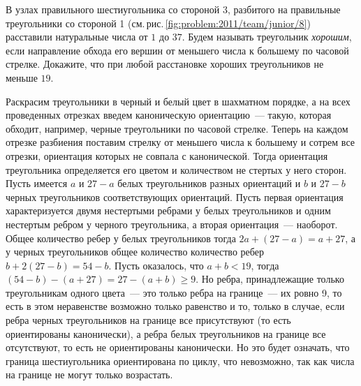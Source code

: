 %
\label{problem:2011/team/junior/8}%
В узлах правильного шестиугольника со стороной 3, разбитого на правильные
треугольники со стороной 1
(см.\,рис.\,\ref{fig:problem:2011/team/junior/8})
расставили натуральные числа от $1$ до $37$.
Будем называть треугольник \emph{хорошим}, если направление обхода его вершин от
меньшего числа к большему по часовой стрелке.
Докажите, что при любой расстановке хороших треугольников не меньше $19$.

\solution
Раскрасим треугольники в черный и белый цвет в шахматном порядке, а на всех
проведенных отрезках введем каноническую ориентацию~--- такую, которая обходит,
например, черные треугольники по часовой стрелке.
Теперь на каждом отрезке разбиения поставим стрелку от меньшего числа к
большему и сотрем все отрезки, ориентация которых не совпала с канонической.
Тогда ориентация треугольника определяется его цветом и количеством не стертых
у него сторон.
Пусть имеется $a$ и $27 - a$ белых треугольников разных ориентаций и $b$ и
$27 - b$ черных треугольников соответствующих ориентаций.
Пусть первая ориентация характеризуется двумя нестертыми ребрами у белых
треугольников и одним нестертым ребром у черного треугольника, а вторая
ориентация~--- наоборот.
Общее количество ребер у белых треугольников тогда
$2 a + (27 - a) = a + 27$, а у черных треугольников общее количество количество
ребер $b + 2 (27 - b) = 54 - b$.
Пусть оказалось, что $a + b < 19$, тогда
$(54 - b) - (a + 27) = 27 - (a + b) \geq 9$.
Но ребра, принадлежащие только треугольникам одного цвета~--- это только ребра
на границе~--- их ровно 9, то есть в этом неравенстве возможно только равенство
и то, только в случае, если ребра черных треугольников на границе все
присутствуют (то есть ориентированы канонически), а ребра белых треугольников
на границе все отсутствуют, то есть не ориентированы канонически.
Но это будет означать, что граница шестиугольника ориентирована по циклу, что
невозможно, так как числа на границе не могут только возрастать.

\endproblem
